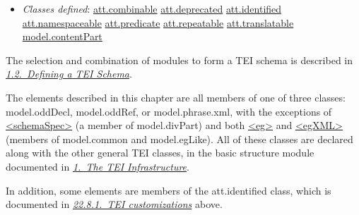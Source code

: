 \begin{description}
\begin{itemize}
\item {\itshape Classes defined}: \hyperref[TEI.att.combinable]{att.combinable} \hyperref[TEI.att.deprecated]{att.deprecated} \hyperref[TEI.att.identified]{att.identified} \hyperref[TEI.att.namespaceable]{att.namespaceable} \hyperref[TEI.att.predicate]{att.predicate} \hyperref[TEI.att.repeatable]{att.repeatable} \hyperref[TEI.att.translatable]{att.translatable} \hyperref[TEI.model.contentPart]{model.contentPart}
\end{itemize} 
\end{description}  The selection and combination of modules to form a TEI schema is described in \textit{\hyperref[STIN]{1.2.\ Defining a TEI Schema}}.\par
The elements described in this chapter are all members of one of three classes: \textsf{model.oddDecl}, \textsf{model.oddRef}, or \textsf{model.phrase.xml}, with the exceptions of \hyperref[TEI.schemaSpec]{<schemaSpec>} (a member of \textsf{model.divPart}) and both \hyperref[TEI.eg]{<eg>} and \hyperref[TEI.egXML]{<egXML>} (members of \textsf{model.common} and \textsf{model.egLike}). All of these classes are declared along with the other general TEI classes, in the basic structure module documented in \textit{\hyperref[ST]{1.\ The TEI Infrastructure}}.\par
In addition, some elements are members of the \textsf{att.identified} class, which is documented in \textit{\hyperref[TDbuild]{22.8.1.\ TEI customizations}} above.
